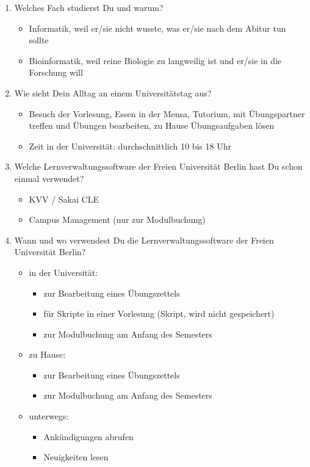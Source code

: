 \documentclass{article}
\begin{document}
\begin{enumerate}
\item Welches Fach studierst Du und warum?
\begin{itemize}
\item Informatik, weil er/sie nicht wusste, was er/sie nach dem Abitur tun sollte
\item Bioinformatik, weil reine Biologie zu langweilig ist und er/sie in die Forschung will
\end{itemize}

\item Wie sieht Dein Alltag an einem Universitätstag aus?
\begin{itemize}
\item Besuch der Vorlesung, Essen in der Mensa, Tutorium, mit Übungspartner treffen und Übungen bearbeiten, zu Hause Übungsaufgaben lösen
\item Zeit in der Universität: durchschnittlich 10 bis 18 Uhr
\end{itemize}

\item Welche Lernverwaltungssoftware der Freien Universität Berlin hast Du schon einmal verwendet?
\begin{itemize}
\item KVV / Sakai CLE
\item Campus Management (nur zur Modulbuchung)
\end{itemize}

\item Wann und wo verwendest Du die Lernverwaltungssoftware der Freien Universität Berlin?
\begin{itemize}
\item in der Universität:
	\begin{itemize}
	\item zur Bearbeitung eines Übungszettels
	\item für Skripte in einer Vorlesung (Skript, wird nicht gespeichert)
	\item zur Modulbuchung am Anfang des Semesters
	\end{itemize} 
\item zu Hause:
	\begin{itemize}
	\item zur Bearbeitung eines Übungszettels
	\item zur Modulbuchung am Anfang des Semesters
	\end{itemize}
\item unterwegs:
	\begin{itemize}
	\item Ankündigungen abrufen
	\item Neuigkeiten lesen
	\end{itemize}
\end{itemize}


\end{enumerate}
\end{document}
